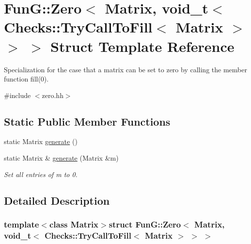 \hypertarget{structFunG_1_1Zero_3_01Matrix_00_01void__t_3_01Checks_1_1TryCallToFill_3_01Matrix_01_4_01_4_01_4}{\section{\-Fun\-G\-:\-:\-Zero$<$ \-Matrix, void\-\_\-t$<$ \-Checks\-:\-:\-Try\-Call\-To\-Fill$<$ \-Matrix $>$ $>$ $>$ \-Struct \-Template \-Reference}
\label{structFunG_1_1Zero_3_01Matrix_00_01void__t_3_01Checks_1_1TryCallToFill_3_01Matrix_01_4_01_4_01_4}
}


\-Specialization for the case that a matrix can be set to zero by calling the member function fill(0).  




{\ttfamily \#include $<$zero.\-hh$>$}

\subsection*{\-Static \-Public \-Member \-Functions}
\begin{DoxyCompactItemize}
\item 
static \-Matrix \hyperlink{structFunG_1_1Zero_3_01Matrix_00_01void__t_3_01Checks_1_1TryCallToFill_3_01Matrix_01_4_01_4_01_4_aad40134e73459a1e0a86c5bb8ceee730}{generate} ()
\item 
static \-Matrix \& \hyperlink{structFunG_1_1Zero_3_01Matrix_00_01void__t_3_01Checks_1_1TryCallToFill_3_01Matrix_01_4_01_4_01_4_a929e1d03c899d4badbb7a3f6fa701e8c}{generate} (\-Matrix \&m)
\begin{DoxyCompactList}\small\item\em \-Set all entries of m to 0. \end{DoxyCompactList}\end{DoxyCompactItemize}


\subsection{\-Detailed \-Description}
\subsubsection*{template$<$class Matrix$>$struct Fun\-G\-::\-Zero$<$ Matrix, void\-\_\-t$<$ Checks\-::\-Try\-Call\-To\-Fill$<$ Matrix $>$ $>$ $>$}

